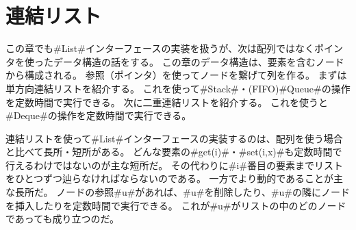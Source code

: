 \chapter{連結リスト}

%
この章でも#List#インターフェースの実装を扱うが、次は配列ではなくポインタを使ったデータ構造の話をする。
この章のデータ構造は、要素を含むノードから構成される。
参照（ポインタ）を使ってノードを繋げて列を作る。
まずは単方向連結リストを紹介する。
これを使って#Stack#・(FIFO)#Queue#の操作を定数時間で実行できる。
次に二重連結リストを紹介する。
これを使うと#Deque#の操作を定数時間で実行できる。

連結リストを使って#List#インターフェースの実装するのは、配列を使う場合と比べて長所・短所がある。
どんな要素の#get(i)#・#set(i,x)#も定数時間で行えるわけではないのが主な短所だ。
その代わりに#i#番目の要素までリストをひとつずつ辿らなければならないのである。
一方でより動的であることが主な長所だ。
ノードの参照#u#があれば、#u#を削除したり、#u#の隣にノードを挿入したりを定数時間で実行できる。
これが#u#がリストの中のどのノードであっても成り立つのだ。

